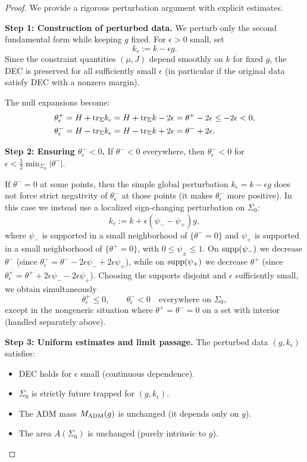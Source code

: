 \begin{proof}
We provide a rigorous perturbation argument with explicit estimates.

\textbf{Step 1: Construction of perturbed data.}
We perturb only the second fundamental form while keeping $g$ fixed. For $\epsilon > 0$ small, set
\[
    k_\epsilon := k - \epsilon g.
\]
Since the constraint quantities $(\mu,J)$ depend smoothly on $k$ for fixed $g$, the DEC is preserved for all sufficiently small $\epsilon$ (in particular if the original data satisfy DEC with a nonzero margin).

The null expansions become:
\begin{align*}
    \theta^+_\epsilon &= H + \mathrm{tr}_\Sigma k_\epsilon = H + \mathrm{tr}_\Sigma k - 2\epsilon = \theta^+ - 2\epsilon \le -2\epsilon < 0, \\
    \theta^-_\epsilon &= H - \mathrm{tr}_\Sigma k_\epsilon = H - \mathrm{tr}_\Sigma k + 2\epsilon = \theta^- + 2\epsilon.
\end{align*}

\textbf{Step 2: Ensuring $\theta^-_\epsilon < 0$.}
If $\theta^- < 0$ everywhere, then $\theta^-_\epsilon < 0$ for $\epsilon < \frac{1}{2}\min_{\Sigma_0}|\theta^-|$.

If $\theta^- = 0$ at some points, then the simple global perturbation $k_\epsilon = k - \epsilon g$ does not force strict negativity of $\theta^-_\epsilon$ at those points (it makes $\theta^-_\epsilon$ more positive). In this case we instead use a localized sign-changing perturbation on $\Sigma_0$:
\[
    k_\epsilon := k + \epsilon(\psi_- - \psi_+) g,
\]
where $\psi_-$ is supported in a small neighborhood of $\{\theta^- = 0\}$ and $\psi_+$ is supported in a small neighborhood of $\{\theta^+ = 0\}$, with $0\le \psi_\pm\le 1$.
On $\mathrm{supp}(\psi_-)$ we decrease $\theta^- $ (since $\theta^-_\epsilon = \theta^- - 2\epsilon\psi_- + 2\epsilon\psi_+$), while on $\mathrm{supp}(\psi_+)$ we decrease $\theta^+$ (since $\theta^+_\epsilon = \theta^+ + 2\epsilon\psi_- - 2\epsilon\psi_+$).
Choosing the supports disjoint and $\epsilon$ sufficiently small, we obtain simultaneously
\[
    \theta^+_\epsilon \le 0,\qquad \theta^-_\epsilon < 0 \quad \text{everywhere on }\Sigma_0,
\]
except in the nongeneric situation where $\theta^+=\theta^-=0$ on a set with interior (handled separately above).

\textbf{Step 3: Uniform estimates and limit passage.}
The perturbed data $(g, k_\epsilon)$ satisfies:
\begin{itemize}
    \item DEC holds for $\epsilon$ small (continuous dependence).
    \item $\Sigma_0$ is strictly future trapped for $(g, k_\epsilon)$.
    \item The ADM mass $M_{\mathrm{ADM}}(g)$ is unchanged (it depends only on $g$).
    \item The area $A(\Sigma_0)$ is unchanged (purely intrinsic to $g$).
\end{itemize}


\end{proof}
